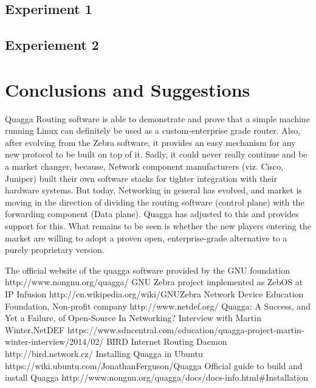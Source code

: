 \documentclass{article}
\begin{document}
\subsection{Experiment 1}
\subsection{Experiement 2}
\clearpage
\section{Conclusions and Suggestions}
Quagga Routing software is able to demonstrate and prove that a simple machine running Linux can definitely
be used as a custom-enterprise grade router. Also, after evolving from the Zebra software, it provides an
easy mechanism for any new protocol to be built on top of it. Sadly, it could never really continue and
be a market changer, because, Network component manufacturers (viz. Cisco, Juniper) built their own software
stacks for tighter integration with their hardware systems. But today, Networking in general has evolved, and
market is moving in the direction of dividing the routing software (control plane) with the forwarding
component (Data plane). Quagga has adjusted to this and provides support for this. What remains to be seen
is whether the new players entering the market are willing to adopt a proven open, enterprise-grade 
alternative to a purely proprietary version.
%
%
\begin{thebibliography}{9}
  The official website of the quagga software provided by the GNU foundation http://www.nongnu.org/quagga/
  GNU Zebra project implemented as ZebOS at IP Infusion http://en.wikipedia.org/wiki/GNU\textunderscore Zebra
   Network Device Education Foundation, Non-profit company http://www.netdef.org/
   Quagga: A Success, and Yet a Failure, of Open-Source In Networking? Interview with Martin Winter,NetDEF https://www.sdncentral.com/education/quagga-project-martin-winter-interview/2014/02/
   BIRD Internet Routing Daemon http://bird.network.cz/
   Installing Quagga in Ubuntu https://wiki.ubuntu.com/JonathanFerguson/Quagga
   Official guide to build and install Quagga http://www.nongnu.org/quagga/docs/docs-info.html\#Installation
\end{thebibliography}
\end{document}

